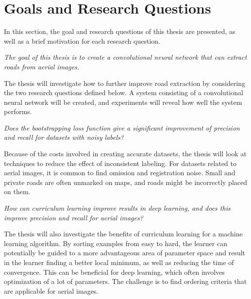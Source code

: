 \section{Goals and Research Questions}
\label{sec:Goals and Research Questions}
In this section, the goal and research questions of this thesis are presented, as well as a brief motivation for each research question.

\begin{description}[ style=nextline, leftmargin=1.5em, rightmargin=1.5em]
\item[Goal statement:]{\it The goal of this thesis is to create a convolutional neural network that can extract roads from aerial images.}
\end{description}

The thesis will investigate how to further improve road extraction by considering the two research questions defined below. A system consisting of a convolutional neural network will be created, and experiments will reveal how well the system performs.

\begin{description}[ style=nextline, leftmargin=1.5em, rightmargin=1.5em]
\item[Research question 1:]{\it Does the bootstrapping loss function give a significant improvement of precision and recall for datasets with noisy labels?}
\end{description}

Because of the costs involved in creating accurate datasets, the thesis will look at techniques to reduce the effect of inconsistent labeling. For datasets related to aerial images, it is common to find omission and registration noise. Small and private roads are often unmarked on maps, and roads might be incorrectly placed on them.

\begin{description}[ style=nextline, leftmargin=1.5em, rightmargin=1.5em]
\item[Research question 2:]{\it How can curriculum learning improve results in deep learning, and does this improve precision and recall for aerial images?}
\end{description}

The thesis will also investigate the benefits of curriculum learning for a machine learning algorithm. By sorting examples from easy to hard, the learner can potentially be guided to a more advantageous area of parameter space and result in the learner finding a better local minimum, as well as reducing the time of convergence. This can be beneficial for deep learning, which often involves optimization of a lot of parameters. The challenge is to find ordering criteria that are applicable for aerial images. 
